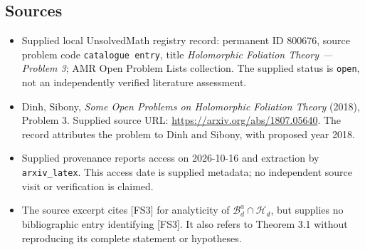 \documentclass[11pt]{article}
\begin{document}
\subsection{Sources}
\begin{itemize}
\item Supplied local UnsolvedMath registry record: permanent ID \(800676\), source problem code \texttt{catalogue entry}, title \emph{Holomorphic Foliation Theory --- Problem 3}; AMR Open Problem Lists collection. The supplied status is \texttt{open}, not an independently verified literature assessment.
\item Dinh, Sibony, \emph{Some Open Problems on Holomorphic Foliation Theory} (2018), Problem 3. Supplied source URL: \url{https://arxiv.org/abs/1807.05640}. The record attributes the problem to Dinh and Sibony, with proposed year 2018.
\item Supplied provenance reports access on 2026-10-16 and extraction by \texttt{arxiv\_latex}. This access date is supplied metadata; no independent source visit or verification is claimed.
\item The source excerpt cites [FS3] for analyticity of \(\mathscr{B}_d^{a}\cap\mathscr{H}_d\), but supplies no bibliographic entry identifying [FS3]. It also refers to Theorem 3.1 without reproducing its complete statement or hypotheses.
\end{itemize}
\end{document}
